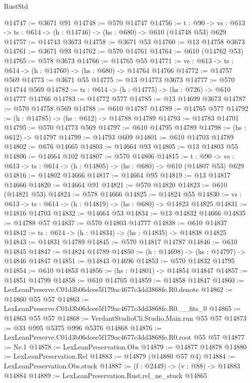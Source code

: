 \begin{lexlean}{RustStd}
\begin{coremodule}
@14747 := @3671 @91
@14748 := @570 @14747
@14756 := {t : @90} ->
  {vs : @613} -> {ts : @614} -> (h : @14746) -> (hs : @680) -> @610 (@14748 @53) @629
@14757 := @14743 @3673
@14758 := @3671 @53
@14760 := @13 @14758 @3673
@14761 := @3671 @93
@14762 := @570 @14761
@14764 := @610 (@14762 @53)
@14765 := @578 @3673
@14766 := @14765 @55
@14771 := {vs : @613} -> {ts : @614} -> (h : @14760) -> (hs : @680) -> @14764 @14766
@14772 := @14757 @569
@14773 := @3671 @55
@14775 := @13 @14773 @3673
@14777 := @570 @14744 @569
@14782 := {ts : @614} -> (h : @14775) -> (hs : @726) -> @610 @14777 @14766
@14783 := @14772 @577
@14785 := @13 @14699 @3673
@14787 := @570 @14758 @569
@14788 := @610 @14787
@14789 := @14765 @577
@14792 := (h : @14785) -> (hs : @612) -> @14788 @14789
@14793 := @14783 @14701
@14795 := @570 @14773 @569
@14797 := @610 @14795 @14789
@14798 := (hs : @612) -> @14797
@14799 := @14793 @609
@14801 := @610 @14703 @14789
@14802 := @676 @14665
@14803 := @14664 @93
@14805 := @13 @14803 @55
@14806 := @14664 @102
@14807 := @570 @14806
@14815 := {t : @90} ->
  {vs : @613} -> {ts : @614} -> (h : @14805) -> (hs : @680) -> @610 (@14807 @53) @629
@14816 := @14802 @14666
@14817 := @14664 @95
@14819 := @13 @14817 @14666
@14820 := @14664 @91
@14821 := @570 @14820
@14823 := @610 (@14821 @53)
@14824 := @578 @14666
@14825 := @14824 @55
@14830 := {vs : @613} -> {ts : @614} -> (h : @14819) -> (hs : @680) -> @14823 @14825
@14831 := @14816 @14703
@14832 := @14664 @53
@14834 := @13 @14832 @14666
@14835 := @14788 @57
@14837 := @570 @14803 @14777
@14838 := @610 @14837
@14842 := {ts : @614} -> (h : @14834) -> (hs : @14835) -> @14838 @14825
@14843 := @14831 @14789
@14845 := @570 @14817 @14787
@14846 := @610 @14845
@14847 := @14824 @14789
@14850 := (h : @14698) -> (hs : @14797) -> @14846 @14847
@14851 := @14843 @14696
@14853 := @570 @14832 @14795
@14854 := @610 @14853
@14856 := (hs : @14801) -> @14854 @14847
@14857 := @14851 @14799
@14858 := @610 @14705
@14859 := @14858 @14847
@14860 := LexLeanPreserve.C01d3b06dcee5f179ac4677c3dd3868fe.R0.denote
@14862 := @14860 @55 @57
@14863 := LexLeanPreserve.C01d3b06dcee5f179ac4677c3dd3868fe.R0.__fits_0
@14865 := @14863 @55 @57
@14868 := VerdantStudioCli.Studio.Main.run @55 @57
@14873 := @33 @995 @5375 @996 @5376 @14868
@14876 := LexLeanPreserve.C01d3b06dcee5f179ac4677c3dd3868fe.R0.root @55 @57
@14877 := Ne.{1}
@14878 := LexLeanPreservation.Obs
@14879 := @14877 @14878
@14880 := LexLeanPreservation.Rel
@14883 := @14879 (@14880 @57 @4)
@14884 := LexLeanPreservation.Obs.stuck
@14887 := (f : @2449) -> (v : @88) -> @14883 @14884
@14889 := LexLeanPreservation.Rust.rel_ne_stuck @14865

\end{coremodule}
\end{lexlean}
